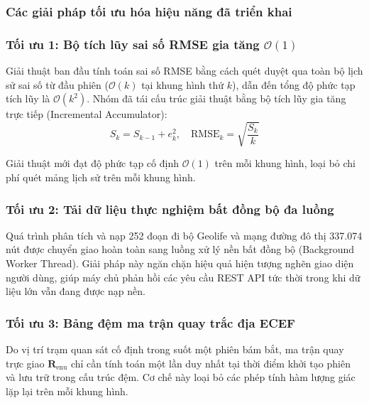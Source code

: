 \subsubsection{Các giải pháp tối ưu hóa hiệu năng đã triển khai}

\subsubsection{Tối ưu 1: Bộ tích lũy sai số RMSE gia tăng \texorpdfstring{$\mathcal{O}(1)$}{O(1)}}

\hspace{0.5cm} Giải thuật ban đầu tính toán sai số RMSE bằng cách quét duyệt qua toàn bộ lịch sử sai số từ đầu phiên ($\mathcal{O}(k)$ tại khung hình thứ $k$), dẫn đến tổng độ phức tạp tích lũy là $\mathcal{O}(k^2)$. Nhóm đã tái cấu trúc giải thuật bằng bộ tích lũy gia tăng trực tiếp (Incremental Accumulator):
\begin{equation}
S_k = S_{k-1} + e_k^2, \quad \text{RMSE}_k = \sqrt{\frac{S_k}{k}}
\label{eq:incremental-rmse-formula}
\end{equation}

Giải thuật mới đạt độ phức tạp cố định $\mathcal{O}(1)$ trên mỗi khung hình, loại bỏ chi phí quét mảng lịch sử trên mỗi khung hình.

\subsubsection{Tối ưu 2: Tải dữ liệu thực nghiệm bất đồng bộ đa luồng}

\hspace{0.5cm} Quá trình phân tích và nạp 252 đoạn đi bộ Geolife và mạng đường đô thị 337.074 nút được chuyển giao hoàn toàn sang luồng xử lý nền bất đồng bộ (Background Worker Thread). Giải pháp này ngăn chặn hiệu quả hiện tượng nghẽn giao diện người dùng, giúp máy chủ phản hồi các yêu cầu REST API tức thời trong khi dữ liệu lớn vẫn đang được nạp nền.

\subsubsection{Tối ưu 3: Bảng đệm ma trận quay trắc địa ECEF}

\hspace{0.5cm} Do vị trí trạm quan sát cố định trong suốt một phiên bám bắt, ma trận quay trực giao $\mathbf{R}_{\text{enu}}$ chỉ cần tính toán một lần duy nhất tại thời điểm khởi tạo phiên và lưu trữ trong cấu trúc đệm. Cơ chế này loại bỏ các phép tính hàm lượng giác lặp lại trên mỗi khung hình.

